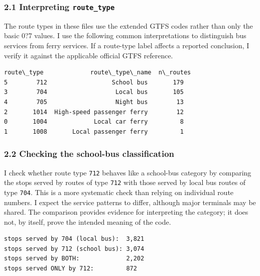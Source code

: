 \documentclass[11pt]{article}
\begin{document}
    \subsubsection{\texorpdfstring{2.1 Interpreting
\texttt{route\_type}}{2.1 Interpreting route\_type}}\label{interpreting-route_type}

The route types in these files use the extended GTFS codes rather than
only the basic 0?7 values. I use the following common interpretations to
distinguish bus services from ferry services. If a route-type label
affects a reported conclusion, I verify it against the applicable
official GTFS reference.

            \begin{tcolorbox}[breakable, size=fbox, boxrule=.5pt, pad at break*=1mm, opacityfill=0]
\begin{Verbatim}[commandchars=\\\{\}]
  route\_type             route\_type\_name  n\_routes
5        712                  School bus       179
3        704                   Local bus       105
4        705                   Night bus        13
2       1014  High-speed passenger ferry        12
0       1004             Local car ferry         8
1       1008       Local passenger ferry         1
\end{Verbatim}
\end{tcolorbox}
        
    \subsubsection{2.2 Checking the school-bus
classification}\label{checking-the-school-bus-classification}

I check whether route type \texttt{712} behaves like a school-bus
category by comparing the stops served by routes of type \texttt{712}
with those served by local bus routes of type \texttt{704}. This is a
more systematic check than relying on individual route numbers. I expect
the service patterns to differ, although major terminals may be shared.
The comparison provides evidence for interpreting the category; it does
not, by itself, prove the intended meaning of the code.

    \begin{Verbatim}[commandchars=\\\{\}]
stops served by 704 (local bus):  3,821
stops served by 712 (school bus): 3,074
stops served by BOTH:             2,202
stops served ONLY by 712:         872
    \end{Verbatim}
\end{document}

